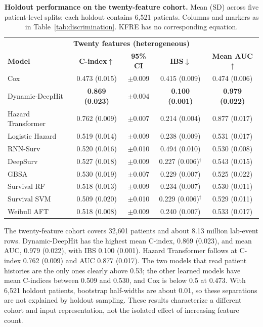 \documentclass[10pt,letterpaper]{article}
\begin{document}
\begin{table}[h!]
\centering
\footnotesize
\setlength{\tabcolsep}{3pt}
\begin{tabular}{@{}lcccc@{}}
\toprule
\multicolumn{5}{c}{\textbf{Twenty features (heterogeneous)}} \\
\textbf{Model} & \textbf{C-index}$\uparrow$ & \textbf{95\% CI} & \textbf{IBS}$\downarrow$ & \textbf{Mean AUC}$\uparrow$ \\
\midrule
Cox & 0.473 (0.015) & $\pm$0.009 & 0.415 (0.009) & 0.474 (0.006) \\
Dynamic-DeepHit & \textbf{0.869 (0.023)} & $\pm$0.004 & \textbf{0.100 (0.001)} & \textbf{0.979 (0.022)} \\
Hazard Transformer & 0.762 (0.009) & $\pm$0.007 & 0.214 (0.004) & 0.877 (0.017) \\
Logistic Hazard & 0.519 (0.014) & $\pm$0.009 & 0.238 (0.009) & 0.531 (0.017) \\
RNN-Surv & 0.520 (0.016) & $\pm$0.010 & 0.494 (0.010) & 0.530 (0.008) \\
DeepSurv & 0.527 (0.018) & $\pm$0.009 & 0.227 (0.006)$^{\dagger}$ & 0.543 (0.015) \\
GBSA & 0.530 (0.019) & $\pm$0.007 & 0.229 (0.007) & 0.525 (0.022) \\
Survival RF & 0.518 (0.013) & $\pm$0.009 & 0.234 (0.007) & 0.530 (0.011) \\
Survival SVM & 0.509 (0.020) & $\pm$0.010 & 0.229 (0.006)$^{\dagger}$ & 0.529 (0.011) \\
Weibull AFT & 0.518 (0.008) & $\pm$0.009 & 0.240 (0.007) & 0.533 (0.017) \\
\bottomrule
\end{tabular}
\caption{{\bf Holdout performance on the twenty-feature cohort.} Mean (SD) across five patient-level splits; each holdout contains 6{,}521 patients. Columns and markers as in Table~\ref{tab:discrimination}. KFRE has no corresponding equation.}
\label{tab:twenty}
\end{table}

The twenty-feature cohort covers 32{,}601 patients and about 8.13 million lab-event rows. Dynamic-DeepHit has the highest mean C-index, 0.869 (0.023), and mean AUC, 0.979 (0.022), with IBS 0.100 (0.001). Hazard Transformer follows at C-index 0.762 (0.009) and AUC 0.877 (0.017). The two models that read patient histories are the only ones clearly above 0.53; the other learned models have mean C-indices between 0.509 and 0.530, and Cox is below 0.5 at 0.473. With 6{,}521 holdout patients, bootstrap half-widths are about 0.01, so these separations are not explained by holdout sampling. These results characterize a different cohort and input representation, not the isolated effect of increasing feature count.
\end{document}
